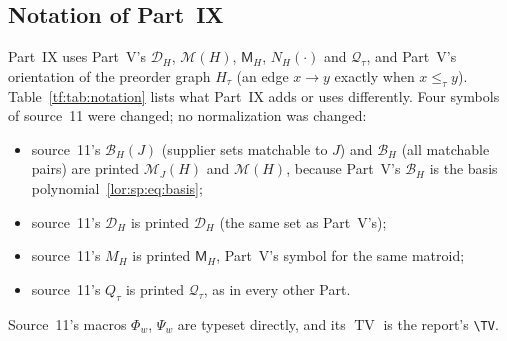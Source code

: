 \documentclass[11pt]{article}
\numberwithin{equation}{section}
\theoremstyle{definition}
\newcommand{\Qt}{\mathcal Q_\tau}
\newcommand{\PM}{\mathcal M}
\newcommand{\cD}{\mathcal D}
\newcommand{\cB}{\mathcal B}
\newcommand{\TV}{\operatorname{TV}}
\begin{document}
\subsection{Notation of Part~IX}
\label{tf:sec:notation}
Part~IX uses Part~V's $\cD_H$, $\PM(H)$, $\mathsf M_H$, $N_H(\cdot)$ and
$\Qt$, and Part~V's orientation of the preorder graph $H_\tau$ (an edge
$x\to y$ exactly when $x\le_\tau y$). Table~\ref{tf:tab:notation} lists
what Part~IX adds or uses differently. Four symbols of source~11 were
changed; no normalization was changed:
\begin{itemize}[leftmargin=1.4em]
\item source~11's $\mathcal B_H(J)$ (supplier sets matchable to $J$) and
$\mathcal B_H$ (all matchable pairs) are printed $\PM_J(H)$ and $\PM(H)$,
because Part~V's $\cB_H$ is the basis polynomial~\eqref{lor:sp:eq:basis};
\item source~11's $\mathcal D_H$ is printed $\cD_H$ (the same set as
Part~V's);
\item source~11's $M_H$ is printed $\mathsf M_H$, Part~V's symbol for the
same matroid;
\item source~11's $Q_\tau$ is printed $\Qt$, as in every other Part.
\end{itemize}
Source~11's macros $\Phi_w$, $\Psi_w$ are typeset directly, and its
$\operatorname{TV}$ is the report's \verb|\TV|.
\end{document}
